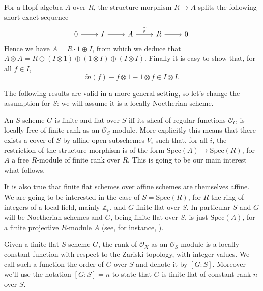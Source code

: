 \begin{defn}
	For a Hopf algebra $A$ over $R$,
	the structure morphism $R \to A$
	splits the following short exact sequence
	\begin{equation*}
	\begin{tikzcd}
		0 \arrow[r, "", rightarrow] &
		I \arrow[r, "", rightarrow] &
		A \arrow[r, "\widetilde{\varepsilon}", rightarrow] &
		R \arrow[r, "", rightarrow] &
		0.
	\end{tikzcd}
	\end{equation*}
	Hence we have $A = R \cdot 1 \oplus I$,
	from which we deduce that $A \otimes A = R \oplus \left( I \otimes 1 \right) \oplus
	\left( 1 \otimes I \right) \oplus \left( I \otimes I \right)$.
	Finally it is easy to show that, for all $f \in I$,
	\begin{equation*}
		\widetilde{m}(f) - f \otimes 1 - 1 \otimes f \in I \otimes I
	.\end{equation*} 
\end{defn}


\noindent
The following results are valid in a more general setting, so let's change
the assumption for $S$: we will assume it is a locally Noetherian scheme.
\begin{rem}\label{rem:finiteGSMotivation}
	An $S$-scheme $G$ is finite and flat over $S$ iff its sheaf of regular functions
	$\mathcal{O}_G$ is locally free of finite rank as an $\mathcal{O}_S$-module.
	More explicitly this means that there exists a cover of $S$ by affine open subschemes
	$V_i$ such that, for all $i$, the restriction of the structure morphism is of the form
	$\mathrm{Spec}(A) \to \mathrm{Spec}(R)$, for $A$ a free $R$-module of finite rank over $R$. 
	This is going to be our main interest what follows.

	It is also true that finite flat schemes over affine schemes
	are themselves affine. 
	We are going to be interested in the case of $S = \mathrm{Spec}(R)$,
	for $R$ the ring of integers of a local field, mainly $\mathbb{Z}_p$,
	and $G$ finite flat over $S$.
	In particular $S$ and $G$ will be Noetherian schemes
	and $G$, being finite flat over $S$, is just $\mathrm{Spec}(A)$,
	for a finite projective $R$-module $A$ (see, for instance, 
	\cite[\href{https://stacks.math.columbia.edu/tag/00NX}{Lemma 00NX}]{SP}).
\end{rem}


\begin{defn}
	Given a finite flat $S$-scheme $G$, the rank of $\mathcal{O}_X$ as
	an $\mathcal{O}_S$-module is a locally constant function with respect
	to the Zariski topology, with integer values.
	We call such a function the order of $G$ over $S$ and denote it by $[G:S]$.
	Moreover we'll use the notation $[G:S] = n$ to state that $G$ is finite flat of
	constant rank $n$ over $S$.
\end{defn}


